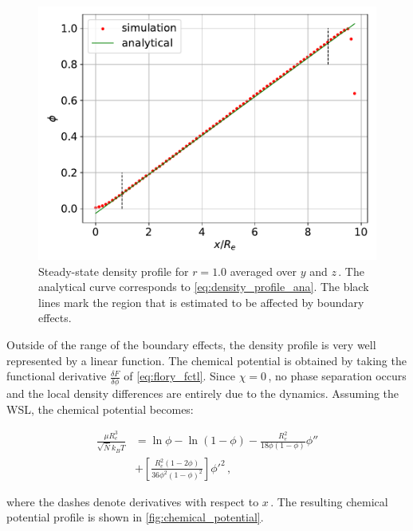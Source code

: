 \documentclass[bachelor,       %
               oneside,        %
               BCOR10mm,       %
               ngerman, english %
               ]{GAUBM}
\begin{document}
\begin{figure}[h]
  \centering
  \includegraphics[width=0.6\linewidth]{figures/density_coll_diff.pdf}
  \caption{Steady-state density profile for $r=1.0$ averaged over $y$ and $z\,$. The analytical curve corresponds to \autoref{eq:density_profile_ana}. The black lines mark the region that is estimated to be affected by boundary effects.}
  \label{fig:density_profile}
\end{figure}

Outside of the range of the boundary effects, the density profile is very well represented by a linear function. The chemical potential is obtained by taking the functional derivative $\frac{\delta F}{\delta\phi}$ of \autoref{eq:flory_fctl}. Since $\chi=0\,$, no phase separation occurs and the local density differences are entirely due to the dynamics. Assuming the WSL, the chemical potential becomes:


\begin{align}
  \frac{\mu R_e^3}{\sqrt{\bar N} k_BT}&=\ln\phi-\ln(1-\phi)-\frac{R_e^2}{18\phi(1-\phi)}\phi''\nonumber \\ &+\left[\frac{R_e^2(1-2\phi)}{36\phi^2(1-\phi)^2}\right]\phi'^2\,,
  \label{eq:mu_flory}
\end{align}

where the dashes denote derivatives with respect to $x\,.$ The resulting chemical potential profile is shown in \autoref{fig:chemical_potential}.
\end{document}
